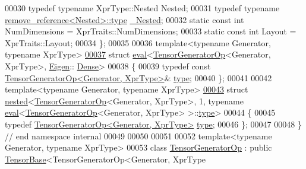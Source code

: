 \begin{DoxyCode}
00030   \textcolor{keyword}{typedef} \textcolor{keyword}{typename} XprType::Nested Nested;
00031   \textcolor{keyword}{typedef} \textcolor{keyword}{typename} \hyperlink{group___sparse_core___module}{remove\_reference<Nested>::type} 
      \hyperlink{group___sparse_core___module}{\_Nested};
00032   \textcolor{keyword}{static} \textcolor{keyword}{const} \textcolor{keywordtype}{int} NumDimensions = XprTraits::NumDimensions;
00033   \textcolor{keyword}{static} \textcolor{keyword}{const} \textcolor{keywordtype}{int} Layout = XprTraits::Layout;
00034 \};
00035 
00036 \textcolor{keyword}{template}<\textcolor{keyword}{typename} Generator, \textcolor{keyword}{typename} XprType>
\hyperlink{struct_eigen_1_1internal_1_1eval_3_01_tensor_generator_op_3_01_generator_00_01_xpr_type_01_4_00_01_eigen_1_1_dense_01_4}{00037} \textcolor{keyword}{struct }\hyperlink{struct_eigen_1_1internal_1_1eval}{eval}<\hyperlink{class_eigen_1_1_tensor_generator_op}{TensorGeneratorOp}<Generator, XprType>, \hyperlink{namespace_eigen}{Eigen}::
      \hyperlink{struct_eigen_1_1_dense}{Dense}>
00038 \{
00039   \textcolor{keyword}{typedef} \textcolor{keyword}{const} \hyperlink{class_eigen_1_1_tensor_generator_op}{TensorGeneratorOp<Generator, XprType>}& 
      \hyperlink{class_eigen_1_1_tensor_generator_op}{type};
00040 \};
00041 
00042 \textcolor{keyword}{template}<\textcolor{keyword}{typename} Generator, \textcolor{keyword}{typename} XprType>
\hyperlink{struct_eigen_1_1internal_1_1nested_3_01_tensor_generator_op_3_01_generator_00_01_xpr_type_01_4_0384769220adcc2cd0a85c8ada993f368}{00043} \textcolor{keyword}{struct }\hyperlink{struct_eigen_1_1internal_1_1nested}{nested}<\hyperlink{class_eigen_1_1_tensor_generator_op}{TensorGeneratorOp}<Generator, XprType>, 1, typename 
      \hyperlink{struct_eigen_1_1internal_1_1eval}{eval}<\hyperlink{class_eigen_1_1_tensor_generator_op}{TensorGeneratorOp}<Generator, XprType> >::\hyperlink{class_eigen_1_1_tensor_generator_op}{type}>
00044 \{
00045   \textcolor{keyword}{typedef} \hyperlink{class_eigen_1_1_tensor_generator_op}{TensorGeneratorOp<Generator, XprType>} 
      \hyperlink{class_eigen_1_1_tensor_generator_op}{type};
00046 \};
00047 
00048 \}  \textcolor{comment}{// end namespace internal}
00049 
00050 
00051 
00052 \textcolor{keyword}{template}<\textcolor{keyword}{typename} Generator, \textcolor{keyword}{typename} XprType>
00053 \textcolor{keyword}{class }\hyperlink{class_eigen_1_1_tensor_generator_op}{TensorGeneratorOp} : \textcolor{keyword}{public} \hyperlink{class_eigen_1_1_tensor_base}{TensorBase}<TensorGeneratorOp<Generator, XprType

\end{DoxyCode}
